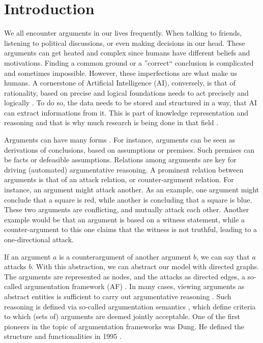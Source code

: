 \chapter{Introduction}
We all encounter arguments in our lives frequently. When talking to friends, listening to political discussions, or even making decisions in our head. These arguments can get heated and complex since humans have different beliefs and motivations. Finding a common ground or a ''correct`` conclusion is complicated and sometimes impossible. However, these imperfections are what make us humans. A cornerstone of Artificial Intelligence (AI), conversely, is that of rationality, based on precise and logical foundations needs to act precisely and logically \cite{DBLP:books/aw/RN2020}. To do so, the data needs to be stored and structured in a way, that AI can extract informations from it. This is part of knowledge representation and reasoning and that is why much research is being done in that field \cite{DBLP:reference/fai/3}.

Arguments can have many forms \cite{Toulmin_2003}. For instance, arguments can be seen as derivations of conclusions, based on assumptions or premises. Such premises can be facts or defeasible assumptions. Relations among arguments are key for driving (automated) argumentative reasoning. A prominent relation between arguments is that of an attack relation, or counter-argument relation. For instance, an argument might attack another. As an example, one argument might conclude that a square is red, while another is concluding that a square is blue. These two arguments are conflicting, and mutually attack each other. Another example would be that an argument is based on a witness statement, while a counter-argument to this one claims that the witness is not truthful, leading to a one-directional attack.



If an argument $a$ is a counterargument of another argument $b$, we can say that $a$ attacks $b$. With this abstraction, we can abstract our model with directed graphs. The arguments are represented as nodes, and the attacks as directed edges, a so-called argumentation framework (AF) \cite{DUNG1995321}. In many cases, viewing arguments as abstract entities is sufficient to carry out argumentative reasoning \cite{handbook-vol-1, handbook-vol-2}. Such reasoning is defined via so-called argumentation semantics \cite{BaroniCG11}, which define criteria to which (sets of) arguments are deemed jointly acceptable. One of the first pioneers in the topic of argumentation frameworks was Dung. He defined the structure and functionalities in 1995 \cite{Dung1995-DUNOTA-2}.

